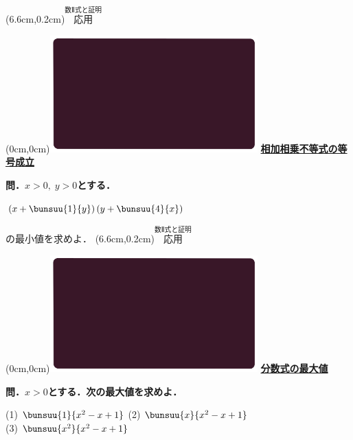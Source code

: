 \documentclass[10pt,
fleqn,
dvipdfmx,
uplatex
]{jsarticle}
\begin{document}
\at(6.6cm,0.2cm){\small\color{bradorange}$\overset{\text{数Ⅱ式と証明}}{\text{応用}}$}


\newpage



\at(0cm,0cm){\includegraphics[width=8cm,bb=0 0 1920 1080]{./youtube/thumbnails/templates/smart_background/数II式と証明.jpeg}}
{\color{orange}\bf\boldmath\Large\underline{相加相乗不等式の等号成立}}\vspace{0.3zw}

\large
\bf\boldmath 問．$x>0,\;y>0$とする．

\huge 
\vspace{0.3zw}
\hspace{0.3zw}$\left(x+\bunsuu{1}{y}\right)\left(y+\bunsuu{4}{x}\right)$
\vspace{0.3zw}

\large
\hfill の最小値を求めよ．
\at(6.6cm,0.2cm){\small\color{bradorange}$\overset{\text{数Ⅱ式と証明}}{\text{応用}}$}


\newpage



\at(0cm,0cm){\includegraphics[width=8cm,bb=0 0 1920 1080]{./youtube/thumbnails/templates/smart_background/数II式と証明.jpeg}}
{\color{orange}\bf\boldmath\huge\underline{分数式の最大値}}\vspace{0.3zw}

\normalsize 
\bf\boldmath 問．$x>0$とする．次の最大値を求めよ．\vspace{0.1zw}

\large
(1)  \Large$\bunsuu{1}{{}x^2-x+1}$\hspace{0.2zw}
\large
(2)  \Large$\bunsuu{x}{{}x^2-x+1}$\vspace{-0.1zw}\\
\large
\hspace{4zw}(3)  \LARGE $\bunsuu{{x^2}}{{x^2-x+1}}$\\
\end{document}

